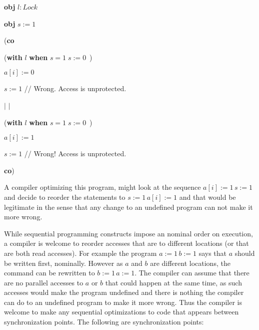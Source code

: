 \documentclass{article}%
\begin{document}
\begin{code}
\textbf{obj} $l:\mathit{Lock}$

\textbf{obj} $s:=1$

(\textbf{co}

\begin{indent}
\item (\textbf{with} $l$ \textbf{when} $s=1\;s:=0$\ )

\item $a[i]:=0$

\item $s:=1$ // Wrong. Access is unprotected.
\end{indent}

%

$\vert$%
$\vert$%


\begin{indent}
\item (\textbf{with} $l$ \textbf{when} $s=1\;s:=0$\ )

\item $a[i]:=1$

\item $s:=1$ // Wrong! Access is unprotected.
\end{indent}

\textbf{co})
\end{code}

\noindent A compiler optimizing this program, might look at the sequence
$a[i]:=1\,s:=1$ and decide to reorder the statements to $s:=1\,a[i]:=1$ and
that would be legitimate in the sense that any change to an undefined program
can not make it more wrong.

While sequential programming constructs impose an nominal order on execution,
a compiler is welcome to reorder accesses that are to different locations (or
that are both read accesses). For example the program $a:=1\,b:=1$ says that
$a$ should be written first, nominally. However as $a$ and $b$ are different
locations, the command can be rewritten to $b:=1\,a:=1$. The compiler can
assume that there are no parallel accesses to $a$ or $b$ that could happen at
the same time, as such accesses would make the program undefined and there is
nothing the compiler can do to an undefined program to make it more wrong.
Thus the compiler is welcome to make any sequential optimizations to code that
appears between synchronization points. The following are synchronization points:
\end{document}

